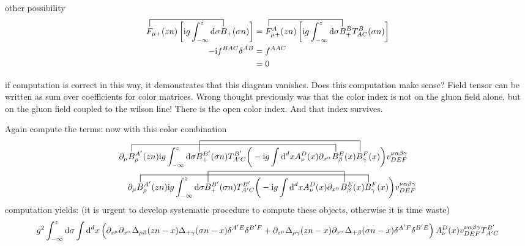 other possibility
\begin{align}
	\contraction[2ex]{}{\ft}{\ft_{\mu +}(zn)\big[ \imag g  \int _{-\infty} ^{z} \dx}{B}
	\ft_{\mu +}(zn)\left[ \imag g  \int _{-\infty} ^{z} \dx \sigma B_+ (\sigma n) \right]	
	&=
	\contraction[2ex]{}{\ft}{\ft^A_{\mu +}(zn)\big[ \imag g  \int _{-\infty} ^{z} \dx}{B}
	\ft^A_{\mu +}(zn)\left[ \imag g  \int _{-\infty} ^{z} \dx \sigma B_+^BT^B_{AC} (\sigma n) \right]
	\\
	-\imag f^{BAC}\delta^{AB}
	&=
	f^{AAC}
	\\
	&=0
\end{align}

if computation is correct in this way, it demonstrates that this diagram vanishes.
Does this computation make sense?  Field tensor can be written as sum over coefficients for color matrices. Wrong thought previously was that the color index is not on the gluon field alone, but on the gluon field coupled to the wilson line! There is the open color index. And that index survives. 

Again compute the terms: now with this color combination
\begin{align}
	&\contraction[2ex]{\partial_\mu}{B}{^{A'}_\rho(zn) \imag g \int _{-\infty}^{z} \dx \sigma B_+^{B'}(\sigma n) T^{B'}_{A'C}\bigg(-\imag g \int \ddx xA_\nu^D(x) \partial_{x^\alpha}}{B}
	\contraction[3ex]{\partial_\mu B^{A'}_\rho (zn) \imag g \int _{-\infty}^{z} \dx \sigma}{B}{_+^{B'}(\sigma n) T^{B'}_{A'C}\bigg(-\imag g \int \ddx xA_\nu^D(x) \partial_{x^\alpha} B_\beta^{E} (x) }{B}
	\partial_\mu B^{A'}_\rho (zn) \imag g \int _{-\infty}^{z} \dx \sigma B_+^{B'}(\sigma n) T^{B'}_{A'C}\bigg(-\imag g \int \ddx xA_\nu^D(x) \partial_{x^\alpha} B_\beta^{E} (x) B_\gamma^F(x) \bigg) v^{\nu \alpha\beta\gamma}_{DEF}
	\nl
	\contraction[2ex]{\partial_\mu}{B}{^{A'}_\rho (zn) \imag g \int _{-\infty}^{z} \dx \sigma B_+^{B'}(\sigma n) T^{B'}_{A'C}\bigg(-\imag g \int \ddx xA_\nu^D(x) \partial_{x^\alpha} B_\beta^{E} (x) }{B}
	\contraction[3ex]{\partial_\mu B^{A'}_\rho (zn) \imag g \int _{-\infty}^{z} \dx \sigma}{B}{_+^{B'}(\sigma n) T^{B'}_{A'C}\bigg(-\imag g \int \ddx xA_\nu^D(x) \partial_{x^\alpha} }{B}
	\partial_\mu B^{A'}_\rho (zn) \imag g \int _{-\infty}^{z} \dx \sigma B_+^{B'}(\sigma n) T^{B'}_{A'C}\bigg(-\imag g \int \ddx xA_\nu^D(x) \partial_{x^\alpha} B_\beta^{E} (x) B_\gamma^F(x) \bigg) v^{\nu \alpha\beta\gamma}_{DEF}
\end{align}
computation yields: (it is urgent to develop systematic procedure to compute these objects, otherwise it is time waste)
\begin{align}
	g^2\int_{-\infty}^z \text{d} \sigma  \int \text{d} ^d x 
	\left( \partial_{z^\mu} \partial_{x^\alpha} \Delta_{\rho \beta}(zn-x) \Delta_{+ \gamma}(\sigma n -x)\delta^{A'E} \delta^{B'F} + \partial_{z^\mu}  \Delta_{\rho \gamma}(zn-x) \partial_{x^\alpha}\Delta_{+ \beta}(\sigma n -x) \delta^{A'F} \delta^{B'E} \right)A_{\nu}^{D}(x)v^{\nu \alpha\beta\gamma}_{DEF} T^{B'}_{A'C}
\end{align}

